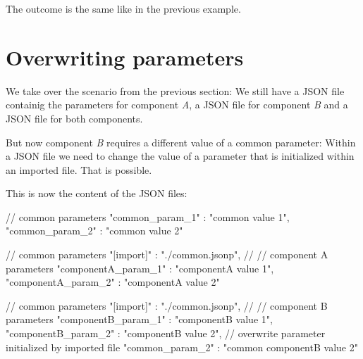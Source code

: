 The outcome is the same like in the previous example.


\newpage

\section{Overwriting parameters}\label{overwriting-parameters}

We take over the scenario from the previous section: We still have a JSON file  containig the parameters for
component \textit{A}, a JSON file  for component \textit{B} and a JSON file  for both components.

But now component \textit{B} requires a different value of a common parameter: Within a JSON file we need to change the value of a parameter
that is initialized within an imported file. That is possible.

\vspace{2ex}

This is now the content of the JSON files:

\vspace{2ex}

\textbullet {}

\begin{pythoncode}
{
   // common parameters
   "common_param_1" : "common value 1",
   "common_param_2" : "common value 2"
}
\end{pythoncode}

\textbullet {}

\begin{pythoncode}
{
   // common parameters
   "[import]" : "./common.jsonp",
   //
   // component A parameters
   "componentA_param_1" : "componentA value 1",
   "componentA_param_2" : "componentA value 2"
}
\end{pythoncode}

\textbullet {}

\begin{pythoncode}[linebackgroundcolor=\hlcode{8,9}]
{
   // common parameters
   "[import]" : "./common.jsonp",
   //
   // component B parameters
   "componentB_param_1" : "componentB value 1",
   "componentB_param_2" : "componentB value 2",
   // overwrite parameter initialized by imported file
   "common_param_2" : "common componentB value 2"
}
\end{pythoncode}

